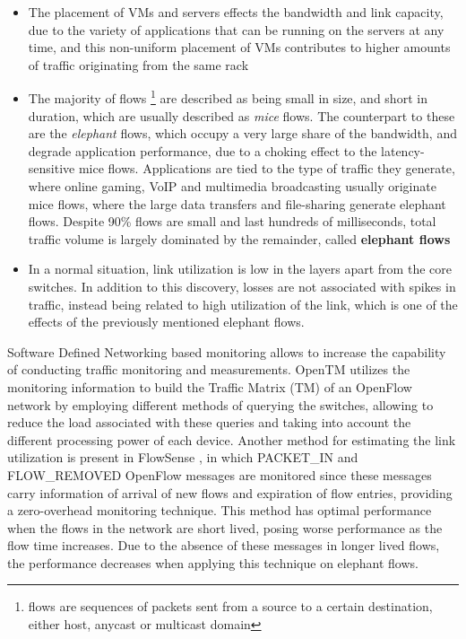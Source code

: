 \begin {itemize}
    \item The placement of VMs and servers effects the bandwidth and link capacity, due to the variety of applications that can be running on the servers at any time,
        and this non-uniform placement of VMs contributes to higher amounts of traffic originating from the same rack
    \item The majority of flows \footnote {flows are sequences of packets sent from a source to a certain destination, either host, anycast or multicast domain} 
        are described as being small in size, and short in duration, which are usually described as \textit {mice} flows. 
        The counterpart to these are the \textit {elephant} flows, which occupy a very large share of the bandwidth, and degrade application performance, due to a
        choking effect to the latency-sensitive mice flows. 
        Applications are tied to the type of traffic they generate, where online gaming, VoIP and multimedia broadcasting usually originate mice flows, where the 
        large data transfers and file-sharing generate elephant flows. Despite 90\% flows are small and last hundreds of milliseconds, total traffic volume is 
        largely dominated by the remainder, called \textbf{elephant flows} \cite{benson_network_2010}
    \item In a normal situation, link utilization is low in the layers apart from the core switches. In addition to this discovery, losses are not associated with 
        spikes in traffic, instead being related to high utilization  of the link, which is one of the effects of the previously mentioned elephant flows.
\end {itemize}

\par Software Defined Networking based monitoring allows to increase the capability of conducting traffic monitoring and measurements. OpenTM 
\cite{krishnamurthy_passive_2010} utilizes the monitoring information to build the Traffic Matrix (TM) of an OpenFlow network by employing different methods of 
querying the switches, allowing to reduce the load associated with these queries and taking into account the different processing power of each device. Another 
method for estimating the link utilization is present in FlowSense \cite{yu_flowsense:_2013}, in which PACKET\_IN and FLOW\_REMOVED OpenFlow messages 
are monitored since these messages carry information of arrival of new flows and expiration of flow entries, providing a zero-overhead monitoring technique. This 
method has optimal performance when the flows in the network are short lived, posing worse performance as the flow time increases. Due to the absence of these 
messages in longer lived flows, the performance decreases when applying this technique on elephant flows.

